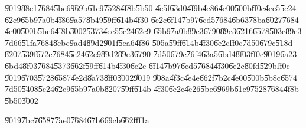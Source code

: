 \documentclass[12pt,a4paper]{article}
\begin{document}
\U{9019}\U{88e1}\U{7684}\U{5be6}\U{969b}\U{61c9}\U{7528}\U{4f8b}\U{5b50}%
\U{4e5f}\U{63d0}\U{4f9b}\U{4e86}\U{4e00}\U{500b}\U{ff0c}\U{4ee5}\U{5c24}%
\U{62c9}\U{65b9}\U{7a0b}\U{4f86}\U{9a57}\U{8b49}\U{59ff}\U{614b}\U{4f30}%
\U{6e2c}\U{6f14}\U{7b97}\U{6cd5}\U{7684}\U{6b63}\U{78ba}\U{6027}\U{7684}%
\U{4e00}\U{500b}\U{5be6}\U{4f8b}\U{3002}\U{5373}\U{4ee5}\U{5c24}\U{62c9}%
\U{65b9}\U{7a0b}\U{89e3}\U{6790}\U{89e3}\U{6216}\U{6578}\U{503c}\U{89e3}%
\U{7d66}\U{51fa}\U{7684}\U{8cbc}\U{9ad4}\U{89d2}\U{901f}\U{5ea6}\U{4f86}%
\U{505a}\U{59ff}\U{614b}\U{4f30}\U{6e2c}\U{ff0c}\U{7d50}\U{679c}\U{518d}%
\U{8207}\U{539f}\U{672c}\U{7684}\U{5c24}\U{62c9}\U{89d2}\U{89e3}\U{6790}%
\U{7d50}\U{679c}\U{76f4}\U{63a5}\U{6bd4}\U{8f03}\U{ff0c}\U{9019}\U{6a23}%
\U{6bd4}\U{8f03}\U{7684}\U{5373}\U{662f}\U{59ff}\U{614b}\U{4f30}\U{6e2c}%
\U{6f14}\U{7b97}\U{6cd5}\U{7684}\U{4f30}\U{6e2c}\U{80fd}\U{529b}\U{ff0c}%
\U{9019}\U{6703}\U{5728}\U{6587}\U{4e2d}\U{8a73}\U{8ff0}\U{3002}\U{9019}%
\U{908a}\U{4f3c}\U{4e4e}\U{662f}\U{7b2c}\U{4e00}\U{500b}\U{5b8c}\U{6574}%
\U{7d50}\U{5408}\U{5c24}\U{62c9}\U{65b9}\U{7a0b}\U{8207}\U{59ff}\U{614b}%
\U{4f30}\U{6e2c}\U{4e26}\U{5be6}\U{969b}\U{61c9}\U{7528}\U{7684}\U{4f8b}%
\U{5b50}\U{3002}

\bigskip

\U{9019}\U{7bc7}\U{6587}\U{7ae0}\U{7684}\U{67b6}\U{69cb}\U{662f}\U{ff1a}
\end{document}
